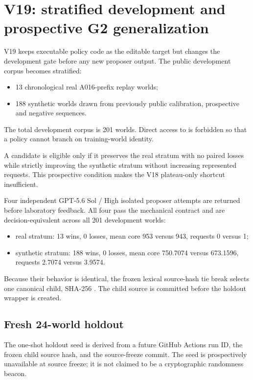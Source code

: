\section{V19: stratified development and prospective G2 generalization}

V19 keeps executable policy code as the editable target but changes the development gate before any new proposer output. The public development corpus becomes stratified:
\begin{itemize}
  \item 13 chronological real A016-prefix replay worlds;
  \item 188 synthetic worlds drawn from previously public calibration, prospective and negative sequences.
\end{itemize}
The total development corpus is 201 worlds. Direct access to  is forbidden so that a policy cannot branch on training-world identity.

A candidate is eligible only if it preserves the real stratum with no paired losses while strictly improving the synthetic stratum without increasing represented requests. This prospective condition makes the V18 plateau-only shortcut insufficient.

Four independent GPT-5.6 Sol / High isolated proposer attempts are returned before laboratory feedback. All four pass the mechanical contract and are decision-equivalent across all 201 development worlds:
\begin{itemize}
  \item real stratum: 13 wins, 0 losses, mean core 953 versus 943, requests 0 versus 1;
  \item synthetic stratum: 188 wins, 0 losses, mean core 750.7074 versus 673.1596, requests 2.7074 versus 3.9574.
\end{itemize}
Because their behavior is identical, the frozen lexical source-hash tie break selects one canonical child, SHA-256 . The child source is committed before the holdout wrapper is created.

\subsection{Fresh 24-world holdout}

The one-shot holdout seed is derived from a future GitHub Actions run ID, the frozen child source hash, and the source-freeze commit. The seed is prospectively unavailable at source freeze; it is not claimed to be a cryptographic randomness beacon.

